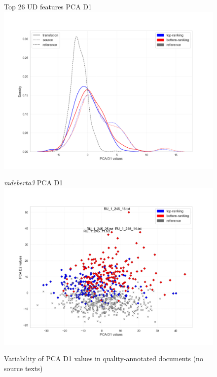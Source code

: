 \begin{figure}[H]
	\begin{minipage}[c]{0.5\linewidth}
		\centering
		Top 26 UD features PCA D1
		\includegraphics[width=\linewidth]{figures/pca/src-bad-good-pca-ud26-D1-lines}
	\end{minipage}	
	\begin{minipage}[c]{0.5\linewidth}
		\centering
		\textit{mdeberta3} PCA D1
		\includegraphics[width=\linewidth]{figures/pca/qua-ttype-mdeberta3-base-PCA-scatter}
	\end{minipage}
	\caption{\label{fig:pca_qua26}Variability of PCA D1 values in quality-annotated documents (no source texts)}	
\end{figure}   

